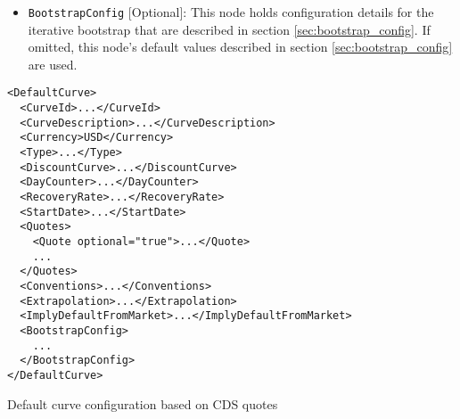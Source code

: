 \begin{itemize}
\item \lstinline!BootstrapConfig! [Optional]:
This node holds configuration details for the iterative bootstrap that are described in section \ref{sec:bootstrap_config}. If omitted, this node's default values described in section \ref{sec:bootstrap_config} are used.

\end{itemize}

\begin{longlisting}
\begin{verbatim}
<DefaultCurve>
  <CurveId>...</CurveId>
  <CurveDescription>...</CurveDescription>
  <Currency>USD</Currency> 
  <Type>...</Type>
  <DiscountCurve>...</DiscountCurve>
  <DayCounter>...</DayCounter>
  <RecoveryRate>...</RecoveryRate>
  <StartDate>...</StartDate>
  <Quotes>
    <Quote optional="true">...</Quote>
    ...
  </Quotes>
  <Conventions>...</Conventions>
  <Extrapolation>...</Extrapolation>
  <ImplyDefaultFromMarket>...</ImplyDefaultFromMarket>
  <BootstrapConfig>
    ...
  </BootstrapConfig>
</DefaultCurve>
\end{verbatim}
\caption{Default curve configuration based on CDS quotes}
\label{lst:defaultcurve_cds_configuration}
\end{longlisting}
